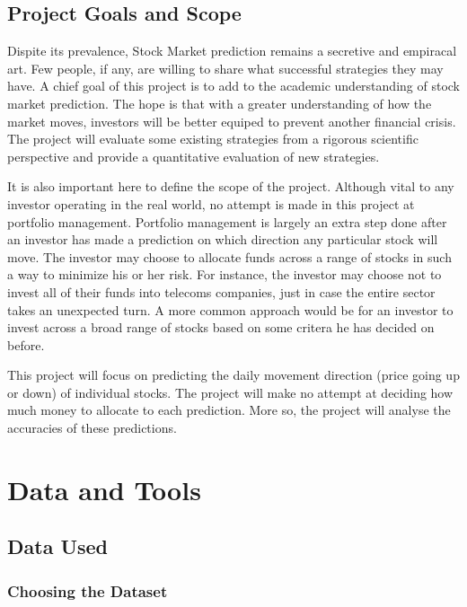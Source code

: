 \documentclass{report}
\begin{document}
\section{Project Goals and Scope}

Dispite its prevalence, Stock Market prediction remains a secretive and empiracal art. Few people, if any, are willing to share what  successful strategies they may have. A chief goal of this project is to add to the academic understanding of stock market prediction. The hope is that with a greater understanding of how the market moves, investors will be better equiped to prevent another financial crisis. The project will evaluate some existing strategies from a rigorous scientific perspective and provide a quantitative evaluation of new strategies. 

It is also important here to define the scope of the project. Although vital to any investor operating in the real world, no attempt is made in this project at portfolio management. Portfolio management is largely an extra step done after an investor has made a prediction on which direction any particular stock will move. The investor may choose to allocate funds across a range of stocks in such a way to minimize his or her risk. For instance, the investor may choose not to invest all of their funds into telecoms companies, just in case the entire sector takes an unexpected turn. A more common approach would be for an investor to invest across a broad range of stocks based on some critera he has decided on before. 

This project will focus on predicting the daily movement direction (price going up or down) of individual stocks. The project will make no attempt at deciding how much money to allocate to each prediction.  More so, the project will analyse the accuracies of these predictions. 

\chapter{Data and Tools}

\section{Data Used}

\subsection{Choosing the Dataset}
\end{document}
